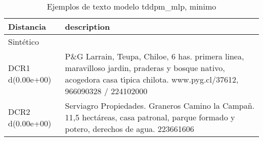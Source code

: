 \begin{table}[H]
\centering
\fontsize{10}{14}\selectfont
\caption{Ejemplos de texto modelo tddpm\_mlp, minimo}
\label{table-example-economicos-b-1-tddpm_mlp-min-text}
\begin{tabular}{|l|m{35em}|}
\hline
\rowcolor[gray]{0.8}
Distancia & description \\
\hline Sintético &  \\
\hline DCR1 d(0.00e+00) & P\&G Larrain, Teupa, Chiloe, 6 has. primera linea, maravilloso jardin, praderas y bosque nativo, acogedora casa t{\'\i}pica chilota. www.pyg.cl/37612, 966090328 / 224102000 \\
\hline DCR2 d(0.00e+00) & Serviagro Propiedades. Graneros Camino la Campa\~n. 11,5 hect\'areas, casa patronal, parque formado y potero, derechos de agua. 223661606 \\
\hline
\end{tabular}
\end{table}
